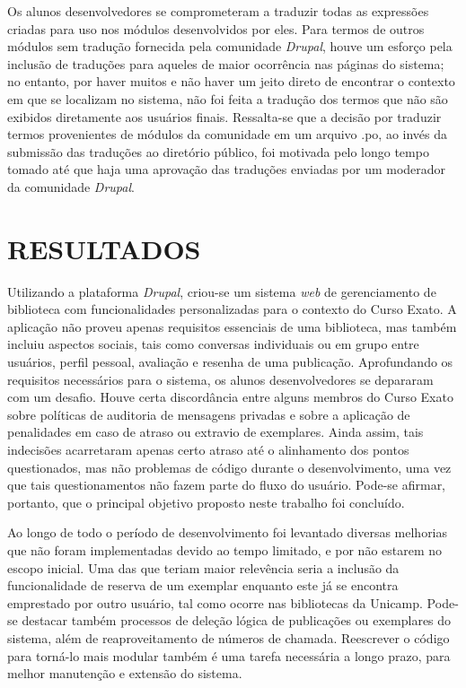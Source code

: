 \documentclass[a4paper]{article}
\begin{document}
Os alunos desenvolvedores se comprometeram a traduzir todas as expressões criadas para uso nos módulos desenvolvidos por eles. Para termos de outros módulos sem tradução fornecida pela comunidade \textit{Drupal}, houve um esforço pela inclusão de traduções para aqueles de maior ocorrência nas páginas do sistema; no entanto, por haver muitos e não haver um jeito direto de encontrar o contexto em que se localizam no sistema, não foi feita a tradução dos termos que não são exibidos diretamente aos usuários finais. Ressalta-se que a decisão por traduzir termos provenientes de módulos da comunidade em um arquivo .po, ao invés da submissão das traduções ao diretório público, foi motivada pelo longo tempo tomado até que haja uma aprovação das traduções enviadas por um moderador da comunidade \textit{Drupal}.

\pagebreak
\section{RESULTADOS} \label{sssec:improvements}
Utilizando a plataforma \textit{Drupal}, criou-se um sistema \textit{web} de gerenciamento de biblioteca com funcionalidades personalizadas para o contexto do Curso Exato. A aplicação não proveu apenas requisitos essenciais de uma biblioteca, mas também incluiu aspectos sociais, tais como conversas individuais ou em grupo entre usuários, perfil pessoal, avaliação e resenha de uma publicação. Aprofundando os requisitos necessários para o sistema, os alunos desenvolvedores se depararam com um desafio. Houve certa discordância entre alguns membros do Curso Exato sobre políticas de auditoria de mensagens privadas e sobre a aplicação de penalidades em caso de atraso ou extravio de exemplares. Ainda assim, tais indecisões acarretaram apenas certo atraso até o alinhamento dos pontos questionados, mas não problemas de código durante o desenvolvimento, uma vez que tais questionamentos não fazem parte do fluxo do usuário. Pode-se afirmar, portanto, que o principal objetivo proposto neste trabalho foi concluído. 

Ao longo de todo o período de desenvolvimento foi levantado diversas melhorias que não foram implementadas devido ao tempo limitado, e por não estarem no escopo inicial. Uma das que teriam maior relevência seria a inclusão da funcionalidade de reserva de um exemplar enquanto este já se encontra emprestado por outro usuário, tal como ocorre nas bibliotecas da Unicamp. Pode-se destacar também processos de deleção lógica de publicações ou exemplares do sistema, além de reaproveitamento de números de chamada. Reescrever o código para torná-lo mais modular também é uma tarefa necessária a longo prazo, para melhor manutenção e extensão do sistema.
\end{document}
